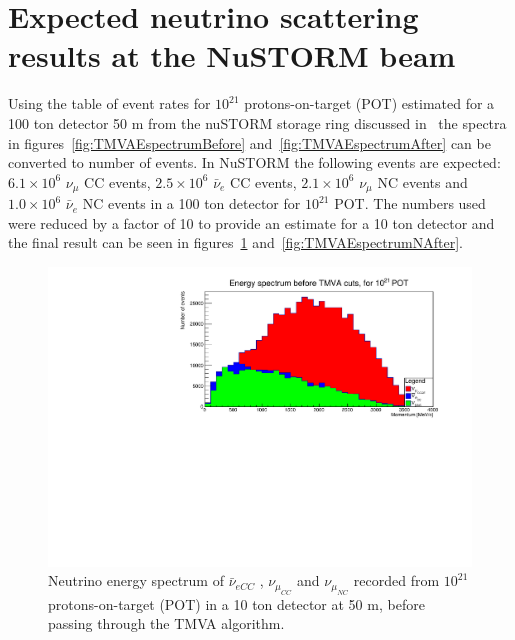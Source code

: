\section{Expected neutrino scattering results at the NuSTORM beam}

Using the table of event rates for $10^{21}$ protons-on-target (POT) estimated for a 100 ton detector 50 m from the nuSTORM storage ring discussed in~\cite{118Soler} the spectra in figures~\ref{fig:TMVAEspectrumBefore} and~\ref{fig:TMVAEspectrumAfter} can be converted to number of events. In NuSTORM the following events are expected: $6.1\times 10^6$ $\nu_\mu$ CC events, $2.5\times 10^6$ $\bar{\nu}_e$ CC events, $2.1\times 10^6$ $\nu_\mu$ NC events and $1.0\times 10^6$ $\bar{\nu}_e$ NC events in a 100 ton detector for $10^{21}$ POT. The numbers used were reduced by a factor of 10 to provide an estimate for a 10 ton detector and the final result can be seen in figures~\ref{fig:TMVAEspectrumNBefore} and~\ref{fig:TMVAEspectrumNAfter}.

\begin{figure}[h!]
\centering
\includegraphics[width=.9\textwidth]{figures/NeutrinoChap/NuSTORM/ActualNumEvents.pdf}
\caption{Neutrino energy spectrum of $\bar{\nu}_{eCC}$ , $\nu_{\mu_{CC}}$ and $\nu_{\mu_{NC}}$ recorded from $10^{21}$ protons-on-target (POT) in a 10 ton detector at 50 m, before passing through the TMVA algorithm.}
\label{fig:TMVAEspectrumNBefore}
\end{figure}

